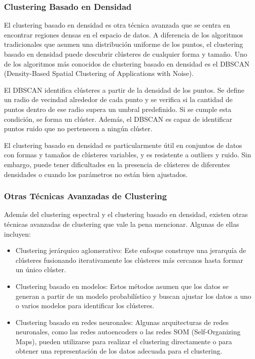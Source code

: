 \documentclass{article}
\begin{document}
\subsubsection{Clustering Basado en Densidad}
El clustering basado en densidad es otra técnica avanzada que se centra en encontrar regiones densas en el espacio de datos. A diferencia de los algoritmos tradicionales que asumen una distribución uniforme de los puntos, el clustering basado en densidad puede descubrir clústeres de cualquier forma y tamaño. Uno de los algoritmos más conocidos de clustering basado en densidad es el DBSCAN (Density-Based Spatial Clustering of Applications with Noise).

El DBSCAN identifica clústeres a partir de la densidad de los puntos. Se define un radio de vecindad alrededor de cada punto y se verifica si la cantidad de puntos dentro de ese radio supera un umbral predefinido. Si se cumple esta condición, se forma un clúster. Además, el DBSCAN es capaz de identificar puntos ruido que no pertenecen a ningún clúster.

El clustering basado en densidad es particularmente útil en conjuntos de datos con formas y tamaños de clústeres variables, y es resistente a outliers y ruido. Sin embargo, puede tener dificultades en la presencia de clústeres de diferentes densidades o cuando los parámetros no están bien ajustados.

\subsubsection{Otras Técnicas Avanzadas de Clustering}
Además del clustering espectral y el clustering basado en densidad, existen otras técnicas avanzadas de clustering que vale la pena mencionar. Algunas de ellas incluyen:

\begin{itemize}
    \item Clustering jerárquico aglomerativo: Este enfoque construye una jerarquía de clústeres fusionando iterativamente los clústeres más cercanos hasta formar un único clúster.
    \item Clustering basado en modelos: Estos métodos asumen que los datos se generan a partir de un modelo probabilístico y buscan ajustar los datos a uno o varios modelos para identificar los clústeres.
    \item Clustering basado en redes neuronales: Algunas arquitecturas de redes neuronales, como las redes autoencoders o las redes SOM (Self-Organizing Maps), pueden utilizarse para realizar el clustering directamente o para obtener una representación de los datos adecuada para el clustering.
\end{itemize}
\end{document}
